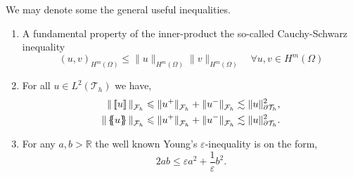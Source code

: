 We may denote some the general useful inequalities.
\begin{enumerate}[label=(\roman*)]
    \item A fundamental property of the inner-product the so-called Cauchy-Schwarz inequality
        \begin{equation}
            \label{eq:cauchy-schwartz}
     ( u,v)_{H^{m}( \Omega )  }   \le \| u \|_{H^{m}( \Omega )   }^{  } \| v \|_{H^{m}( \Omega )    }^{  }\quad  \forall u,v \in H^{m}( \Omega )
        \end{equation}

    \item For all  $u \in L ^{2}( \mathcal{T} _{h})$ we have,
\begin{equation}
    \label{eq:mean_jump_estimate}
    \begin{split}
        \| \left[\!\left[   u  \right]\!\right]   \|_{ \mathcal{F} _{h} }^{  } & \leqslant \|  u^{+}   \|_{ \mathcal{F} _{h} }^{  } +
        \| u^{-}   \|_{ \mathcal{F} _{h} }^{  }  \lesssim  \| u \|_{ \partial\mathcal{T }_{h}  }^{2  },\\
        \| \left\{\!\!\left\{ u \right\}\!\!\right\}   \|_{ \mathcal{F} _{h} }^{  } & \leqslant \| u^{+} \|_{ \mathcal{F} _{h}  }^{  } + \| u^{-} \|_{ \mathcal{F} _{h}  }^{  }    \lesssim  \| u \|_{ \partial\mathcal{T }_{h}  }^{2  }.
    \end{split}
\end{equation}

    \item For any $a,b >\mathbb{R} $ the well known Young's $\varepsilon $-inequality is on the form,
        \begin{equation}
            \label{eq:young-epsilon}
            2ab \le \varepsilon a^2+ \frac{1}{\varepsilon } b^2.
        \end{equation}

\end{enumerate}







